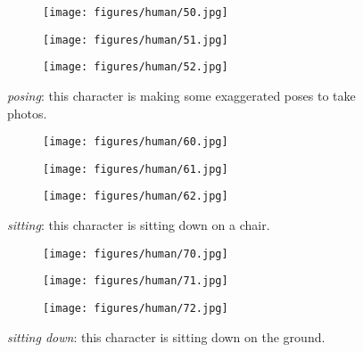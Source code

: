 \documentclass[runningheads]{llncs}
\begin{document}
\begin{figure}[h!]
  \centering
  \begin{subfigure}{0.99\textwidth}
    \texttt{[image: figures/human/50.jpg]}
\end{subfigure}
  \begin{subfigure}{0.99\textwidth}
    \texttt{[image: figures/human/51.jpg]}
\end{subfigure}
  \begin{subfigure}{0.99\textwidth}
    \texttt{[image: figures/human/52.jpg]}
\end{subfigure}
  \caption{\textit{posing}: this character is making some exaggerated poses to take photos.}
\label{fig:human_5}
\end{figure}

\begin{figure}[h!]
  \centering
  \begin{subfigure}{0.99\textwidth}
    \texttt{[image: figures/human/60.jpg]}
\end{subfigure}
  \begin{subfigure}{0.99\textwidth}
    \texttt{[image: figures/human/61.jpg]}
\end{subfigure}
  \begin{subfigure}{0.99\textwidth}
    \texttt{[image: figures/human/62.jpg]}
\end{subfigure}
  \caption{\textit{sitting}: this character is sitting down on a chair.}
  \label{fig:human_6}
\end{figure}

\begin{figure}[h!]
  \centering
  \begin{subfigure}{0.99\textwidth}
    \texttt{[image: figures/human/70.jpg]}
\end{subfigure}
  \begin{subfigure}{0.99\textwidth}
    \texttt{[image: figures/human/71.jpg]}
\end{subfigure}
  \begin{subfigure}{0.99\textwidth}
    \texttt{[image: figures/human/72.jpg]}
\end{subfigure}
  \caption{\textit{sitting down}: this character is sitting down on the ground.}
  \label{fig:human_7}
\end{figure}
\end{document}
